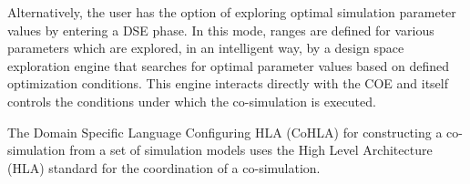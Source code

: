 Alternatively, the user has the option of exploring optimal simulation parameter values by entering a DSE phase.
%
In this mode, ranges are defined for various parameters which are explored, in an intelligent way, by a design space exploration engine that searches for optimal parameter values based on defined optimization conditions.
%
This engine interacts directly with the COE and itself controls the conditions under which the co-simulation is executed.

The Domain Specific Language Configuring HLA (CoHLA) for constructing a co-simulation from a set of simulation models uses the High Level Architecture (HLA) standard for the coordination of a co-simulation.
